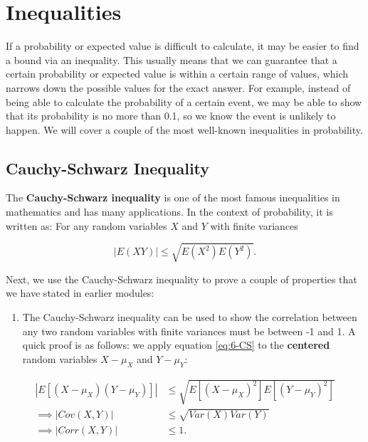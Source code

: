 \documentclass[
]{book}
\providecommand{\tightlist}{%
  \setlength{\itemsep}{0pt}\setlength{\parskip}{0pt}}
\begin{document}
\hypertarget{inequalities}{%
\section{Inequalities}\label{inequalities}}

If a probability or expected value is difficult to calculate, it may be easier to find a bound via an inequality. This usually means that we can guarantee that a certain probability or expected value is within a certain range of values, which narrows down the possible values for the exact answer. For example, instead of being able to calculate the probability of a certain event, we may be able to show that its probability is no more than 0.1, so we know the event is unlikely to happen. We will cover a couple of the most well-known inequalities in probability.

\hypertarget{cauchy-schwarz-inequality}{%
\subsection{Cauchy-Schwarz Inequality}\label{cauchy-schwarz-inequality}}

The \textbf{Cauchy-Schwarz inequality} is one of the most famous inequalities in mathematics and has many applications. In the context of probability, it is written as: For any random variables \(X\) and \(Y\) with finite variances

\begin{equation} 
|E(XY)| \leq \sqrt{E(X^2)E(Y^2)}.
\label{eq:6-CS}
\end{equation}

Next, we use the Cauchy-Schwarz inequality to prove a couple of properties that we have stated in earlier modules:

\begin{enumerate}
\def\labelenumi{\arabic{enumi}.}
\tightlist
\item
  The Cauchy-Schwarz inequality can be used to show the correlation between any two random variables with finite variances must be between -1 and 1. A quick proof is as follows: we apply equation \eqref{eq:6-CS} to the \textbf{centered} random variables \(X - \mu_X\) and \(Y - \mu_Y\):
\end{enumerate}

\[
\begin{split}
|E[(X - \mu_X)(Y - \mu_Y)]| & \leq \sqrt{E[(X - \mu_X)^2] E[(Y - \mu_Y)^2]} \\
\implies |Cov(X,Y)| & \leq \sqrt{Var(X) Var(Y)} \\
\implies |Corr(X,Y)| & \leq 1.
\end{split}
\]
\end{document}
